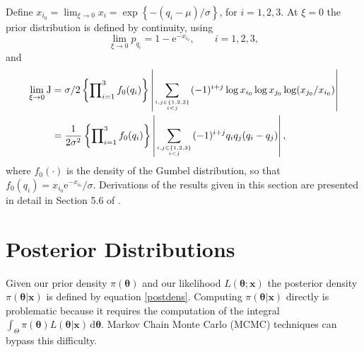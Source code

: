 \documentclass[11pt,a4paper]{article}
\newcommand{\bs}{\boldsymbol}
\newcommand{\sfrac}[2]{\genfrac{}{}{0pt}{}{#1}{#2}}
\begin{document}
Define $x_{i_0} = \lim_{\xi\rightarrow0} x_i = \exp \left\{ -(
  q_i-\mu)/\sigma \right\}$, for $i=1,2,3$. At $\xi=0$ the prior
distribution is defined by continuity, using
\begin{equation*}
  \lim_{\xi\rightarrow0}p_{q_i} = 1 - \text{e}^{ - x_{i_0}},  \qquad i=1,2,3,
\end{equation*}
and 
\begin{align*}
  \lim_{\xi\rightarrow0}\text{J} &= \sigma/2 \left\{
    \prod\nolimits_{i=1}^3 f_0(q_i) \right\} \left| \sum_{\sfrac{i,j
        \in \{1,2,3\}}{i < j}} (-1)^{i+j} \log x_{i_0} \log x_{j_0}
    \log (x_{j_0} / x_{i_0}) \right| \\ 
  &= \frac{1}{2\sigma^2} \left\{ \prod\nolimits_{i=1}^3 f_0(q_i)
  \right\} \left| \sum_{\sfrac{i,j \in \{1,2,3\}}{i < j}} (-1)^{i+j}
    q_i q_j (q_i - q_j) \right|,
\end{align*}
where $f_0(\cdot)$ is the density of the Gumbel distribution, so that
$f_0(q_i) = x_{i_0}\text{e}^{-x_{i_0}}/\sigma$.  Derivations of the
results given in this section are presented in detail in Section 5.6
of \citet{step:phd}.

\section{Posterior Distributions}
\setcounter{footnote}{0}
\label{posterior}

Given our prior density $\pi(\bs{\theta})$ and our likelihood
$L(\bs{\theta};\bs{x})$ the posterior density
$\pi(\bs{\theta}|\bs{x})$ is defined by equation \eqref{postdens}.
Computing $\pi(\bs{\theta}|\bs{x})$ directly is problematic because it
requires the computation of the integral $\int_{\Theta}
\pi(\bs{\theta})L(\bs{\theta}|\bs{x}) \, \text{d}\bs{\theta}$.  Markov
Chain Monte Carlo (MCMC) techniques can bypass this difficulty.
\end{document}
